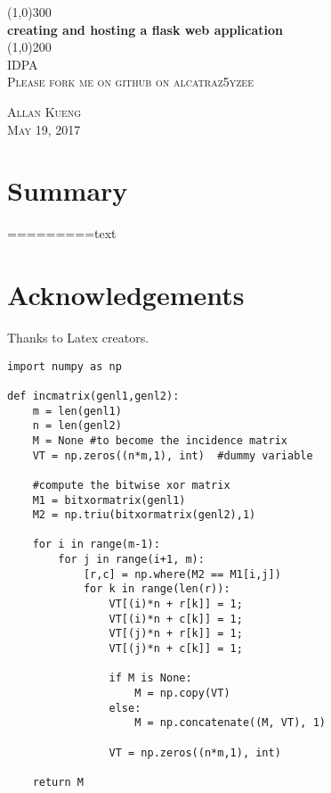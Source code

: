 \documentclass{article}
\begin{document}
\begin{titlepage}
    \begin{center}
    \line(1,0){300} \\ %
    [3mm]%
    \huge{\bfseries creating and hosting a flask web application} \\
    [2mm]%
    \line(1,0){200} \\ %
    [1.5cm]%
    \textsc{\LARGE IDPA} \\
    [0.75cm]
    \textsc{\Large Please fork me on github on alcatraz5yzee} \\
    [9cm]
    \end{center}
    \begin{flushright}
    \textsc{\large Allan Kueng\\
    May 19, 2017 \\}
    \end{flushright}
\end{titlepage}


\section*{Summary}
=========text
\cleardoublepage



\section*{Acknowledgements}
Thanks to Latex creators.



\begin{lstlisting}
import numpy as np

def incmatrix(genl1,genl2):
    m = len(genl1)
    n = len(genl2)
    M = None #to become the incidence matrix
    VT = np.zeros((n*m,1), int)  #dummy variable

    #compute the bitwise xor matrix
    M1 = bitxormatrix(genl1)
    M2 = np.triu(bitxormatrix(genl2),1)

    for i in range(m-1):
        for j in range(i+1, m):
            [r,c] = np.where(M2 == M1[i,j])
            for k in range(len(r)):
                VT[(i)*n + r[k]] = 1;
                VT[(i)*n + c[k]] = 1;
                VT[(j)*n + r[k]] = 1;
                VT[(j)*n + c[k]] = 1;

                if M is None:
                    M = np.copy(VT)
                else:
                    M = np.concatenate((M, VT), 1)

                VT = np.zeros((n*m,1), int)

    return M
\end{lstlisting}
\end{document}
